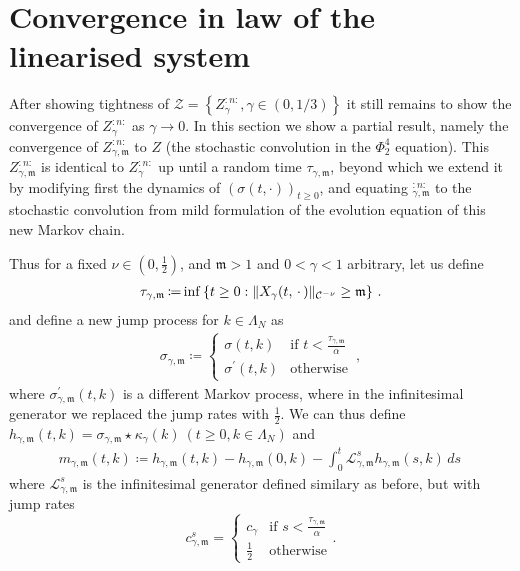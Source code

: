 \documentclass{report}
\DeclarePairedDelimiter\norm{\lVert}{\rVert}%
\newcommand{\Placeholder}{\,\mathrel{\cdot}\,}
\newcommand{\Convolve}[3][]{#2 \star_{#1} #3}
\DeclareMathOperator{\DefiningEquality}{\coloneqq}
\theoremstyle{remark}
\theoremstyle{definition}
\begin{document}
\chapter{Convergence in law of the linearised system}
After showing tightness of $\mathcal{Z} = \left\{Z^{:n:}_\gamma, \gamma\in(0, 1/3)\right\}$ it still remains to show the convergence of $Z^{:n:}_\gamma$ as $\gamma \to 0$. In this section we show a partial result, namely the convergence of $Z^{:n:}_{\gamma, \mathfrak{m}}$ to $Z$ (the stochastic convolution in the $\Phi^4_2$ equation). This $Z^{:n:}_{\gamma, \mathfrak{m}}$ is identical to $Z^{:n:}_{\gamma}$ up until a random time $\tau_{\gamma, \mathfrak{m}}$, beyond which we extend it by modifying first the dynamics of $(\sigma(t, \cdot))_{t \ge 0}$, and equating $^{:n:}_{\gamma, \mathfrak{m}}$ to the stochastic convolution from mild formulation of the evolution equation of this new Markov chain.

Thus for a fixed $\nu \in \left(0, \frac{1}{2}\right)$, and $\mathfrak{m} > 1$ and $0 < \gamma < 1$ arbitrary, let us define
\begin{align}
  \tau_{\gamma, \mathfrak{m}} \DefiningEquality \inf \left\{t \ge 0: \norm{X_\gamma(t, \Placeholder)}_{\mathcal{C}^{-\nu}} \ge \mathfrak{m}\right\}\,.
\end{align}
and define a new jump process for $k \in \Lambda_N$ as 
\begin{align*}
  \sigma_{\gamma, \mathfrak{m}} \DefiningEquality \begin{cases}
    \sigma(t, k)&\text{if } t < \frac{\tau_{\gamma, \mathfrak{m}}}{\alpha}\\
    \sigma^\prime(t, k)&\text{otherwise}
  \end{cases}\,,
\end{align*}
where $\sigma^\prime_{\gamma, \mathfrak{m}}(t, k)$ is a different Markov process, where in the infinitesimal generator we replaced the jump rates with $\frac{1}{2}$. We can thus define $h_{\gamma, \mathfrak{m}}(t, k) = \Convolve{\sigma_{\gamma,\mathfrak{m}}}{\kappa_\gamma}(k)~(t \ge 0, k \in \Lambda_N)$ and \begin{align*}
  m_{\gamma, \mathfrak{m}}(t, k) \DefiningEquality h_{\gamma, \mathfrak{m}}(t, k) - h_{\gamma, \mathfrak{m}}(0, k) - \int_{0}^{t} \mathcal{L}^s_{\gamma, \mathfrak{m}} h_{\gamma, \mathfrak{m}}(s, k)\,ds\,
\end{align*}
where $\mathcal{L}^s_{\gamma, \mathfrak{m}}$ is the infinitesimal generator defined similary as before, but with jump rates $$c^s_{\gamma, \mathfrak{m}} = \begin{cases}
  c_\gamma&\text{if }s < \frac{\tau_{\gamma, \mathfrak{m}}}{\alpha}\\
  \frac{1}{2}&\text{otherwise}
\end{cases}.$$
\end{document}
